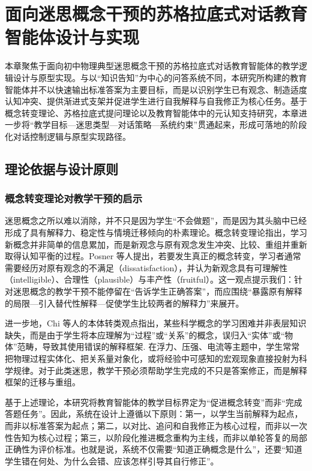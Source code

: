\chapter{面向迷思概念干预的苏格拉底式对话教育智能体设计与实现}
\label{chapter:chapter04}

本章聚焦于面向初中物理典型迷思概念干预的苏格拉底式对话教育智能体的教学逻辑设计与原型实现。与以“知识告知”为中心的问答系统不同，本研究所构建的教育智能体并不以快速输出标准答案为主要目标，而是以识别学生已有观念、制造适度认知冲突、提供渐进式支架并促进学生进行自我解释与自我修正为核心任务。基于概念转变理论、苏格拉底式提问理论以及教育智能体中的元认知支持研究，本章进一步将“教学目标—迷思类型—对话策略—系统约束”贯通起来，形成可落地的阶段化对话控制逻辑与原型实现路径。

\section{理论依据与设计原则}
\label{sec:4.1}

\subsection{概念转变理论对教学干预的启示}
\label{sec:4.1.1}

迷思概念之所以难以消除，并不只是因为学生“不会做题”，而是因为其头脑中已经形成了具有解释力、稳定性与情境迁移倾向的朴素理论。概念转变理论指出，学习新概念并非简单的信息累加，而是新观念与原有观念发生冲突、比较、重组并重新取得认知平衡的过程。Posner 等人提出，若要发生真正的概念转变，学习者通常需要经历对原有观念的不满足（dissatisfaction），并认为新观念具有可理解性（intelligible）、合理性（plausible）与丰产性（fruitful）\cite{posner1982accommodation}。这一观点提示我们：针对迷思概念的教学干预不能停留在“告诉学生正确答案”，而应围绕“暴露原有解释的局限—引入替代性解释—促使学生比较两者的解释力”来展开。

进一步地，Chi 等人的本体转类观点指出，某些科学概念的学习困难并非表层知识缺失，而是由于学生将本应理解为“过程”或“关系”的概念，误归入“实体”或“物体”范畴，导致其使用错误的解释框架\cite{chi1994things}. 在浮力、压强、电流等主题中，学生常常把物理过程实体化、把关系量对象化，或将经验中可感知的宏观现象直接投射为科学规律。对于此类迷思，教学干预必须帮助学生完成的不只是答案修正，而是解释框架的迁移与重组。

基于上述理论，本研究将教育智能体的教学目标界定为“促进概念转变”而非“完成答题任务”。因此，系统在设计上遵循以下原则：第一，以学生当前解释为起点，而非以标准答案为起点；第二，以对比、追问和自我修正为核心过程，而非以一次性告知为核心过程；第三，以阶段化推进概念重构为主线，而非以单轮答复的局部正确性为评价标准。也就是说，系统不仅需要“知道正确概念是什么”，还要“知道学生错在何处、为什么会错、应该怎样引导其自行修正”。

